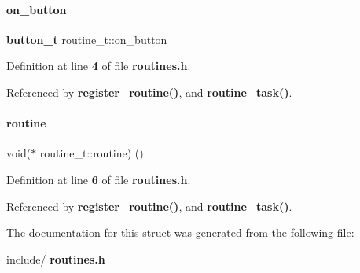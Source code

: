 \paragraph{on\+\_\+button}
{\footnotesize\ttfamily \textbf{ button\+\_\+t} routine\+\_\+t\+::on\+\_\+button}



Definition at line \textbf{ 4} of file \textbf{ routines.\+h}.



Referenced by \textbf{ register\+\_\+routine()}, and \textbf{ routine\+\_\+task()}.

\mbox{\label{structroutine__t_a016f918d811a58ee2b63a5e48161dcf8}} 
\paragraph{routine}
{\footnotesize\ttfamily void($\ast$ routine\+\_\+t\+::routine) ()}



Definition at line \textbf{ 6} of file \textbf{ routines.\+h}.



Referenced by \textbf{ register\+\_\+routine()}, and \textbf{ routine\+\_\+task()}.



The documentation for this struct was generated from the following file\+:\begin{DoxyCompactItemize}
\item 
include/\textbf{ routines.\+h}\end{DoxyCompactItemize}
